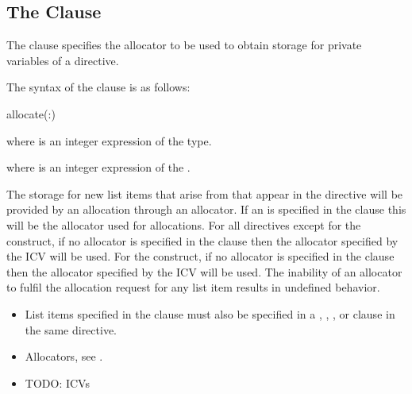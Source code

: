 \syntax

\descr

\subsection{The  Clause}
\label{subsec:allocate Clause}
\summary
The  clause specifies the allocator to be used to obtain storage for private variables of a directive.

\syntax

The syntax of the  clause is as follows:

\begin{boxedcode}
allocate(\plc{[allocator}:\plc{] list})
\end{boxedcode}

\ccppspecificstart
\begin{ccppspecific}
where  is an integer expression of the  type.
\end{ccppspecific}
\begin{fortranspecific}
where  is an integer expression of the  .
\end{fortranspecific}

\descr

The storage for new list items that arise from  that appear in the directive will be provided by an allocation through an allocator. If an  is specified in the clause this will be the allocator used for allocations. For all directives except for the  construct, if no allocator is specified in the clause then the allocator specified by the  ICV will be used. For the  construct, if no allocator is specified in the clause then the allocator specified by the  ICV will be used.  The inability of an allocator to fulfil the allocation request for any list item results in undefined behavior.

\restrictions
\begin{itemize}
\item List items specified in the  clause must also be specified in a , , ,  or 
       clause in the same directive.
\end{itemize}

\crossreferences
\begin{itemize}
\item Allocators, see .
\item TODO: ICVs
\end{itemize}